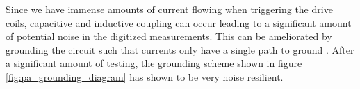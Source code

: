 





Since we have immense amounts of current flowing when triggering the drive coils, capacitive and inductive coupling can occur leading to a significant amount of potential noise in the digitized measurements. This can be ameliorated by grounding the circuit such that currents only have a single path to ground \cite{Horowitz_Hill_1989}. After a significant amount of testing, the grounding scheme shown in figure \ref{fig:pa_grounding_diagram} has shown to be very noise resilient.



